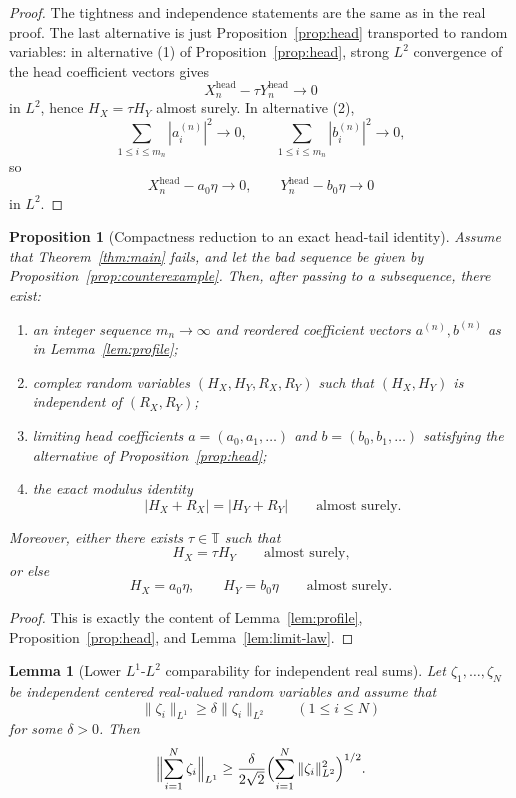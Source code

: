 \documentclass[11pt]{amsart}
\newtheorem{proposition}[theorem]{Proposition}
\newtheorem{lemma}[theorem]{Lemma}
\newcommand{\T}{\mathbb{T}}
\begin{document}
\begin{proof}
The tightness and independence statements are the same as in the real proof.
The last alternative is just Proposition~\ref{prop:head} transported to random
variables: in alternative \textup{(1)} of Proposition~\ref{prop:head}, strong
$L^2$ convergence of the head coefficient vectors gives
\[
  X_n^{\mathrm{head}}-\tau Y_n^{\mathrm{head}}\longrightarrow 0
\]
in $L^2$, hence $H_X=\tau H_Y$ almost surely.  In alternative \textup{(2)},
\[
  \sum_{1\le i\le m_n} |a_i^{(n)}|^2
  \longrightarrow 0,
  \qquad
  \sum_{1\le i\le m_n} |b_i^{(n)}|^2
  \longrightarrow 0,
\]
so
\[
  X_n^{\mathrm{head}}-a_0\eta\longrightarrow 0,
  \qquad
  Y_n^{\mathrm{head}}-b_0\eta\longrightarrow 0
\]
in $L^2$.
\end{proof}

\begin{proposition}[Compactness reduction to an exact head-tail identity]
\label{prop:compactness-reduction}
Assume that Theorem~\ref{thm:main} fails, and let the bad sequence be given by
Proposition~\ref{prop:counterexample}.  Then, after passing to a subsequence,
there exist:
\begin{enumerate}[label=\rm(\arabic*)]
\item an integer sequence $m_n\to\infty$ and reordered coefficient vectors
  $a^{(n)},b^{(n)}$ as in Lemma~\ref{lem:profile};
\item complex random variables $(H_X,H_Y,R_X,R_Y)$ such that
  $(H_X,H_Y)$ is independent of $(R_X,R_Y)$;
\item limiting head coefficients $a=(a_0,a_1,\dots)$ and $b=(b_0,b_1,\dots)$
  satisfying the alternative of Proposition~\ref{prop:head};
\item the exact modulus identity
  \[
    |H_X+R_X|=|H_Y+R_Y|
    \qquad\text{almost surely.}
  \]
\end{enumerate}
Moreover, either there exists $\tau\in\T$ such that
\[
  H_X=\tau H_Y
  \qquad\text{almost surely,}
\]
or else
\[
  H_X=a_0\eta,
  \qquad
  H_Y=b_0\eta
  \qquad\text{almost surely.}
\]
\end{proposition}

\begin{proof}
This is exactly the content of Lemma~\ref{lem:profile},
Proposition~\ref{prop:head}, and Lemma~\ref{lem:limit-law}.
\end{proof}

\begin{lemma}[Lower $L^1$-$L^2$ comparability for independent real sums]
\label{lem:real-l1l2}
Let $\zeta_1,\dots,\zeta_N$ be independent centered real-valued random
variables and assume that
\[
  \|\zeta_i\|_{L^1}\ge \delta \|\zeta_i\|_{L^2}
  \qquad (1\le i\le N)
\]
for some $\delta>0$.  Then
\[
  \Bigl\|\sum_{i=1}^N \zeta_i\Bigr\|_{L^1}
  \ge
  \frac{\delta}{2\sqrt 2}
  \Bigl(\sum_{i=1}^N \|\zeta_i\|_{L^2}^2\Bigr)^{1/2}.
\]
\end{lemma}
\end{document}
